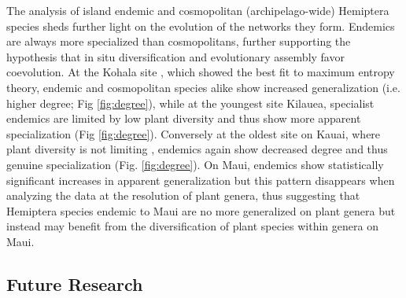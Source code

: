 \documentclass[12pt]{article}
\begin{document}
\begin{linenumbers}
The analysis of island endemic and cosmopolitan (archipelago-wide)
Hemiptera species sheds further light on the evolution of the networks
they form. Endemics are always more specialized than cosmopolitans,
further supporting the hypothesis that in situ diversification and
evolutionary assembly favor coevolution. At the Kohala site , which
showed the best fit to maximum entropy theory, endemic and
cosmopolitan species alike show increased generalization (i.e. higher
degree; Fig \ref{fig:degree}), while at the youngest site Kilauea,
specialist endemics are limited by low plant diversity and thus show
more apparent specialization (Fig \ref{fig:degree}). Conversely at the
oldest site on Kauai, where plant diversity is not limiting
\citep{kitayama1995}, endemics again show decreased degree and thus
genuine specialization (Fig. \ref{fig:degree}). On Maui, endemics show
statistically significant increases in apparent generalization but
this pattern disappears when analyzing the data at the resolution of
plant genera, thus suggesting that Hemiptera species endemic to Maui
are no more generalized on plant genera but instead may benefit from
the diversification of plant species within genera on Maui.

\subsection*{Future Research}


\end{linenumbers}
\end{document}
